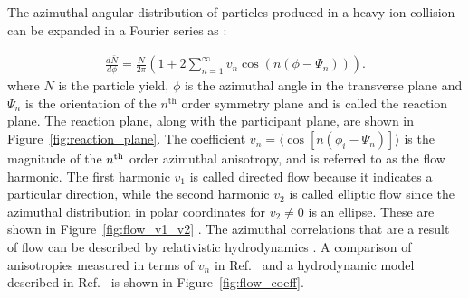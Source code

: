 
The azimuthal angular distribution of particles produced in a heavy ion collision can be expanded in a Fourier series as \cite{Poskanzer:1998yz}: 

\begin{align}
\frac{d\bar{N}}{d\phi} = \frac{N}{2\pi} \left( 1 + 2 \sum_{n=1}^{\infty} v_{n} \cos(n(\phi-\Psi_n)) \right).
\end{align}
where  $N$ is the particle yield, $\phi$ is the azimuthal angle in the transverse plane and $\Psi_n$ is the orientation of the $n^{\mathrm{th}}$ order symmetry plane and is called the reaction plane.
The reaction plane, along with the participant plane, are shown in Figure~\ref{fig:reaction_plane}.
The coefficient $v_n = \langle \cos[n(\phi_i - \Psi_n)] \rangle$ is the magnitude of the $n^{\rm{th}}$ order azimuthal anisotropy, and is referred to as the flow harmonic.
The first harmonic $v_1$ is called directed flow because it indicates a particular direction, while the second harmonic $v_2$ is called elliptic flow since the azimuthal distribution in polar coordinates for $v_2 \neq 0$ is an ellipse.
These are shown in Figure~\ref{fig:flow_v1_v2} \cite{Voloshin:2008dg}.
The azimuthal correlations that are a result of flow can be described by relativistic hydrodynamics \cite{Teaney:2001av, HIRANO2006299}.
A comparison of anisotropies measured in terms of $v_n$ in Ref.~\cite{ALICE:2011ab} and a hydrodynamic model described in Ref.~\cite{Niemi:2015qia} is shown in Figure~\ref{fig:flow_coeff}.


